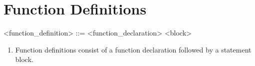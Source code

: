 \section{Function Definitions}
\begin{grammar}
	<function_definition> ::= <function_declaration> <block>
\end{grammar}
\begin{enumerate}
	\item Function definitions consist of a function declaration followed by a statement block.
\end{enumerate}
